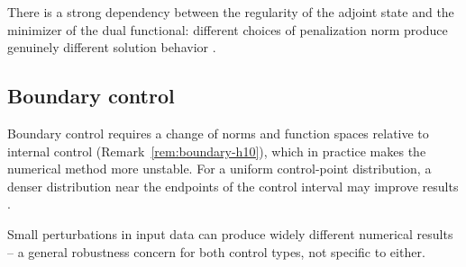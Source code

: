 \begin{remark}
  There is a strong dependency between the regularity of the adjoint state
  and the minimizer of the dual functional: different choices of penalization
  norm produce genuinely different solution behavior
  \citep{kindermann1999convergence}.
\end{remark}

\subsection{Boundary control}

Boundary control requires a change of norms and function spaces relative to
internal control (Remark~\ref{rem:boundary-h10}), which in practice makes the
numerical method more unstable. For a uniform control-point distribution, a
denser distribution near the endpoints of the control interval may improve
results \citep{kalimeris2021numerical}.

\begin{remark}
  Small perturbations in input data can produce widely different numerical
  results -- a general robustness concern for both control types, not
  specific to either.
\end{remark}
